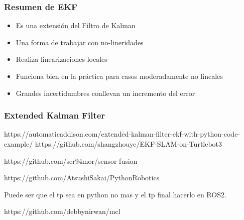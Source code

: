 \begin{frame}
    \frametitle{Resumen de EKF}
    
    \begin{itemize}
        \item Es una extensión del Filtro de Kalman
        \item Una forma de trabajar con no-lineridades
        \item Realiza linearizaciones locales
        \item Funciona bien en la práctica para casos moderadamente no lineales
        \item Grandes incertidumbres conllevan un incremento del error
    \end{itemize}
    
\end{frame}

\begin{frame}
    \frametitle{Extended Kalman Filter}
    
    
    https://automaticaddison.com/extended-kalman-filter-ekf-with-python-code-example/
    https://github.com/shangzhouye/EKF-SLAM-on-Turtlebot3
    
    https://github.com/ser94mor/sensor-fusion
    
    https://github.com/AtsushiSakai/PythonRobotics
    
    Puede ser que el tp sea en python no mas y el tp final hacerlo en ROS2.
    
    https://github.com/debbynirwan/mcl
    
    
\end{frame}
